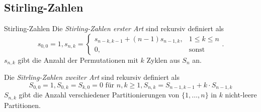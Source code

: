 \documentclass[../../main.tex]{subfiles}
\begin{document}
\subsection{Stirling-Zahlen}
\begin{nutshell}{Stirling-Zahlen}
    Die \emph{Stirling-Zahlen erster Art} sind rekursiv definiert als
    $$s_{0,0}=1, s_{n,k} = \begin{cases}s_{n-k,k-1} + (n-1) s_{n-1,k}, & 1\leq k \leq n\\0,&\text{sonst}\end{cases}.$$
    $s_{n,k}$ gibt die Anzahl der Permutationen mit $k$ Zyklen aus $S_n$ an.
    
    Die \emph{Sitrling-Zahlen zweiter Art} sind rekursiv definiert als
    $$S_{0,0}=1, S_{0,k} = S_{k,0} = 0 \text{ für } n,k \geq 1, S_{n,k} = S_{n-1,k-1}+k\cdot S_{n-1, k}$$
    $S_{n,k}$ gibt die Anzahl verschiedener Partitionierungen von $\{1, \dots, n\}$ in $k$ nicht-leere Partitionen.
\end{nutshell}
\end{document}
